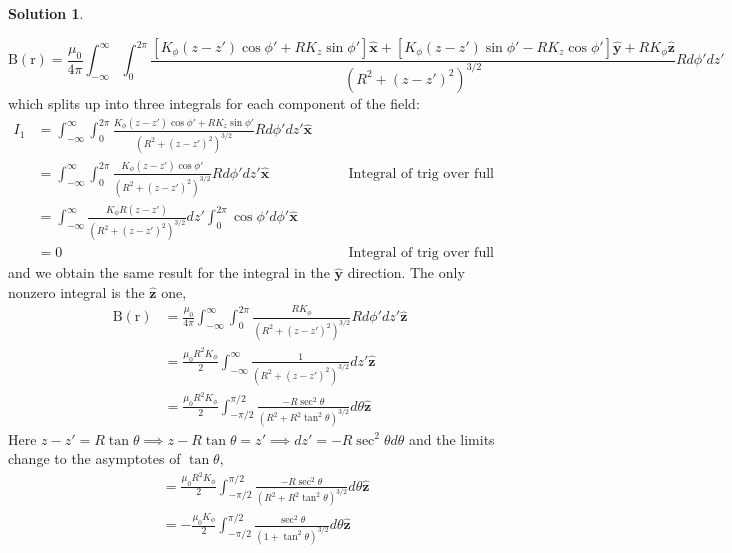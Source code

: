 \documentclass[10pt]{article}
\theoremstyle{definition}
\newtheorem{soln}{Solution}
\newcommand{\ux}{\hat{\mathbf{x}}}
\newcommand{\uy}{\hat{\mathbf{y}}}
\newcommand{\uz}{\hat{\mathbf{z}}}
\newcommand{\justif}[2]{&{#1}&\text{#2}}
\newcommand{\bv}[1]{\bm{\mathrm{#1}}}
\begin{document}
\begin{soln}
\begin{enumerate}[label=(\alph*)]
          $$\bv{B}(\bv{r})=\frac{\mu_0}{4\pi}\int_{-\infty}^{\infty}\int_0^{2\pi}\frac{\left[K_\phi(z-z')\cos\phi'+RK_z\sin\phi'\right]\ux
              +\left[K_\phi(z-z')\sin\phi'-RK_z\cos\phi'\right]\uy
              +RK_\phi\uz}{\left(R^2+(z-z')^2\right)^{3/2}}Rd\phi'dz'$$
          which splits up into three integrals for each component of the field:
          \begin{align*}
            I_1 & =\int_{-\infty}^{\infty}\int_0^{2\pi}\frac{K_\phi(z-z')\cos\phi'+RK_z\sin\phi'}{\left(R^2+(z-z')^2\right)^{3/2}}Rd\phi'dz'\ux                                             \\
                & =\int_{-\infty}^{\infty}\int_0^{2\pi}\frac{K_\phi(z-z')\cos\phi'}{\left(R^2+(z-z')^2\right)^{3/2}}Rd\phi'dz'\ux \justif{\quad}{Integral of trig over full period is zero} \\
                & =\int_{-\infty}^{\infty}\frac{K_\phi R(z-z')}{\left(R^2+(z-z')^2\right)^{3/2}}dz'\int_0^{2\pi}\cos\phi'd\phi'\ux                                                          \\
                & =0\justif{\quad}{Integral of trig over full period is zero}
          \end{align*}
          and we obtain the same result for the integral in the $\uy$ direction. The only nonzero integral is the $\uz$ one,
          \begin{align*}
            \bv{B}(\bv{r}) & =\frac{\mu_0}{4\pi}\int_{-\infty}^{\infty}\int_0^{2\pi}\frac{RK_\phi}{\left(R^2+(z-z')^2\right)^{3/2}}Rd\phi'dz'\uz   \\
                           & =\frac{\mu_0R^2K_\phi}{2}\int_{-\infty}^{\infty}\frac{1}{\left(R^2+(z-z')^2\right)^{3/2}}dz'\uz                       \\
                           & =\frac{\mu_0R^2K_\phi}{2}\int_{-\pi/2}^{\pi/2}\frac{-R\sec^2\theta}{\left(R^2+R^2\tan^2\theta\right)^{3/2}}d\theta\uz
          \end{align*}
          Here $z-z'=R\tan\theta\implies z-R\tan\theta=z'\implies dz'=-R\sec^2\theta d\theta$ and the limits change to the asymptotes of $\tan\theta$,
          \begin{align*}
             & =\frac{\mu_0R^2K_\phi}{2}\int_{-\pi/2}^{\pi/2}\frac{-R\sec^2\theta}{\left(R^2+R^2\tan^2\theta\right)^{3/2}}d\theta\uz        \\
             & =-\frac{\mu_0K_\phi}{2}\int_{-\pi/2}^{\pi/2}\frac{\sec^2\theta}{\left(1+\tan^2\theta\right)^{3/2}}d\theta\uz                 \\

\end{align*}
\end{enumerate}
\end{soln}
\end{document}
